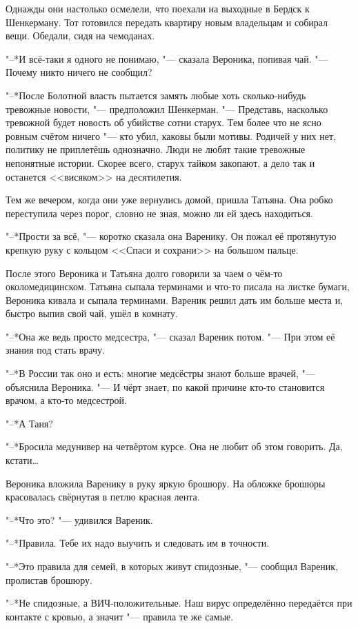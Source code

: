 Однажды они настолько осмелели, что поехали на выходные в Бердск к Шенкерману.
Тот готовился передать квартиру новым владельцам и собирал вещи.
Обедали, сидя на чемоданах.

"--*И всё-таки я одного не понимаю, "--- сказала Вероника, попивая чай.
"--- Почему никто ничего не сообщил?

"--*После Болотной власть пытается замять любые хоть сколько-нибудь тревожные новости, "--- предположил Шенкерман.
"--- Представь, насколько тревожной будет новость об убийстве сотни старух.
Тем более что не ясно ровным счётом ничего "--- кто убил, каковы были мотивы.
Родичей у них нет, политику не приплетёшь однозначно.
Люди не любят такие тревожные непонятные истории.
Скорее всего, старух тайком закопают, а дело так и останется <<висяком>> на десятилетия.

Тем же вечером, когда они уже вернулись домой, пришла Татьяна.
Она робко переступила через порог, словно не зная, можно ли ей здесь находиться.

"--*Прости за всё, "--- коротко сказала она Варенику.
Он пожал её протянутую крепкую руку с кольцом <<Спаси и сохрани>> на большом пальце.

После этого Вероника и Татьяна долго говорили за чаем о чём-то околомедицинском.
Татьяна сыпала терминами и что-то писала на листке бумаги, Вероника кивала и сыпала терминами.
Вареник решил дать им больше места и, быстро выпив свой чай, ушёл в комнату.

"--*Она же ведь просто медсестра, "--- сказал Вареник потом.
"--- При этом её знания под стать врачу.

"--*В России так оно и есть: многие медсёстры знают больше врачей, "--- объяснила Вероника.
"--- И чёрт знает, по какой причине кто-то становится врачом, а кто-то медсестрой.

"--*А Таня?

"--*Бросила медунивер на четвёртом курсе.
Она не любит об этом говорить.
Да, кстати\ldots{}

Вероника вложила Варенику в руку яркую брошюру.
На обложке брошюры красовалась свёрнутая в петлю красная лента.

"--*Что это? "--- удивился Вареник.

"--*Правила.
Тебе их надо выучить и следовать им в точности.

"--*Это правила для семей, в которых живут спидозные, "--- сообщил Вареник, пролистав брошюру.

"--*Не спидозные, а ВИЧ-положительные.
Наш вирус определённо передаётся при контакте с кровью, а значит "--- правила те же самые.

